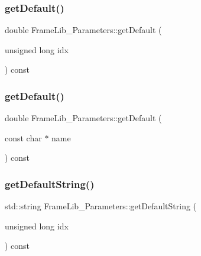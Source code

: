 \subsubsection{\texorpdfstring{get\+Default()}{getDefault()}\hspace{0.1cm}{\footnotesize\ttfamily [1/2]}}
{\footnotesize\ttfamily double Frame\+Lib\+\_\+\+Parameters\+::get\+Default (\begin{DoxyParamCaption}\item[{unsigned long}]{idx }\end{DoxyParamCaption}) const\hspace{0.3cm}{\ttfamily [inline]}}

\mbox{\label{class_frame_lib___parameters_a2524dc5f2566eb521f95a342eb980239}} 
\subsubsection{\texorpdfstring{get\+Default()}{getDefault()}\hspace{0.1cm}{\footnotesize\ttfamily [2/2]}}
{\footnotesize\ttfamily double Frame\+Lib\+\_\+\+Parameters\+::get\+Default (\begin{DoxyParamCaption}\item[{const char $\ast$}]{name }\end{DoxyParamCaption}) const\hspace{0.3cm}{\ttfamily [inline]}}

\mbox{\label{class_frame_lib___parameters_aa6544b983343464c17299ab6f1874bce}} 
\subsubsection{\texorpdfstring{get\+Default\+String()}{getDefaultString()}\hspace{0.1cm}{\footnotesize\ttfamily [1/2]}}
{\footnotesize\ttfamily std\+::string Frame\+Lib\+\_\+\+Parameters\+::get\+Default\+String (\begin{DoxyParamCaption}\item[{unsigned long}]{idx }\end{DoxyParamCaption}) const}

